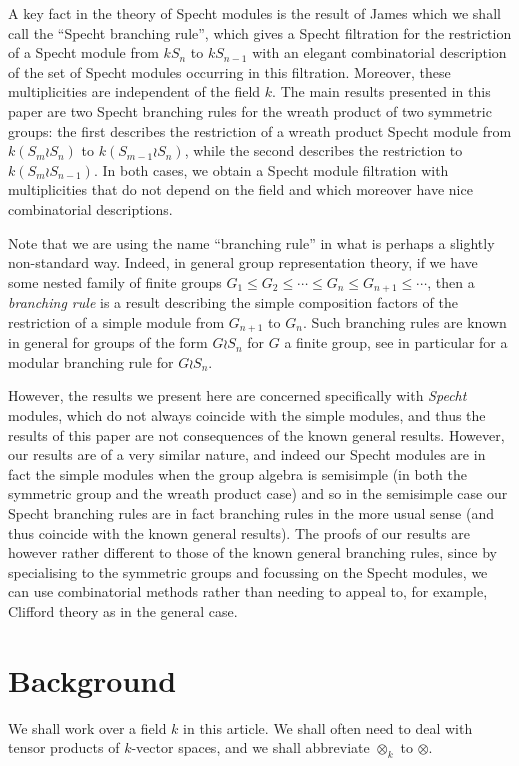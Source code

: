 \documentclass[10pt]{article}
\theoremstyle{definition}
\begin{document}
A key fact in the theory of Specht modules is the result of James which we shall call the ``Specht branching rule'',
which gives a Specht filtration for the restriction of a Specht module from $kS_n$ to $kS_{n-1}$ with an
elegant combinatorial description of the set of Specht modules occurring in this filtration. Moreover, these multiplicities are
independent of the field $k$. The main results presented in this paper are two Specht branching rules for the wreath product of two
symmetric groups: the first describes the restriction of a wreath product Specht module from $k(S_m \wr S_n)$ to $k(S_{m-1} \wr S_n)$,
while the second describes the restriction to $k(S_m \wr S_{n-1})$. In both cases, we obtain a Specht module filtration with
multiplicities that do not depend on the field and which moreover have nice combinatorial descriptions.

Note that we are using the name ``branching rule'' in what is perhaps a slightly non-standard way. Indeed, in general group
representation theory, if we have some nested family of finite groups $G_1 \leq G_2 \leq \cdots \leq G_n \leq G_{n+1} \leq \cdots$, then a
\textit{branching rule} is a result describing the simple composition factors of the restriction of a simple module from $G_{n+1}$ to
$G_n$. Such branching rules are known in general for groups of the form $G \wr S_n$ for $G$ a finite group, see in particular
\cite{TSUWRBR} for a modular branching rule for $G \wr S_n$.

However, the results we present here are concerned specifically with \textit{Specht} modules, which do not always coincide with the simple
modules, and thus the results of this paper are not consequences of the known general results. However, our results are of a very similar
nature, and indeed our Specht modules are in fact the simple modules when the group algebra is semisimple (in both the symmetric group
and the wreath product case) and so in the semisimple case our Specht branching rules are in fact branching rules in the more usual
sense (and thus coincide with the known general results). The proofs of our results are however rather different to those of the known
general branching rules, since by specialising to the symmetric groups and focussing on the Specht modules, we can use combinatorial
methods rather than needing to appeal to, for example, Clifford theory as in the general case.


\section{Background}
We shall work over a field $k$ in this article. We shall often need to deal with tensor products of $k$-vector spaces, and we shall
abbreviate $\otimes_k$ to $\otimes$.
\end{document}
